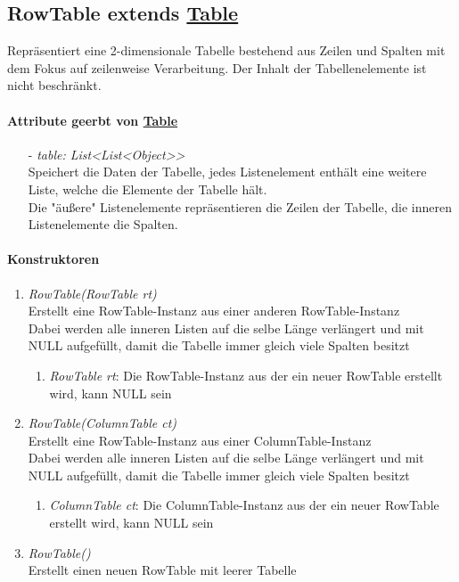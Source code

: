 \subsection{RowTable extends \hyperref[Table]{Table}}	
Repräsentiert eine 2-dimensionale Tabelle bestehend aus Zeilen und Spalten mit dem Fokus auf zeilenweise Verarbeitung. Der Inhalt der Tabellenelemente ist nicht beschränkt.
	
	
\paragraph{Attribute geerbt von \hyperref[Table]{Table}}

\begin{itemize}
	\item[-] \textit{table: List{<List<Object>}>} \\
	Speichert die Daten der Tabelle, jedes Listenelement enthält eine weitere Liste, welche die Elemente der Tabelle hält. \\
	Die "äußere" Listenelemente repräsentieren die Zeilen der Tabelle, die inneren Listenelemente die Spalten.
\end{itemize}


\paragraph{Konstruktoren}

\begin{enumerate}[+]
	\item \textit{RowTable(RowTable rt)} \\
	Erstellt eine RowTable-Instanz aus einer anderen RowTable-Instanz \\
	Dabei werden alle inneren Listen auf die selbe Länge verlängert und mit NULL aufgefüllt, damit die Tabelle immer gleich viele Spalten besitzt	
	\begin{enumerate}[$\bullet$]
		\item \textit{RowTable rt}: Die RowTable-Instanz aus der ein neuer RowTable erstellt wird, kann NULL sein
	\end{enumerate}
	\vspace{-0.2cm}
	
	
	\item \textit{RowTable(ColumnTable ct)} \\
	Erstellt eine RowTable-Instanz aus einer ColumnTable-Instanz \\
	Dabei werden alle inneren Listen auf die selbe Länge verlängert und mit NULL aufgefüllt, damit die Tabelle immer gleich viele Spalten besitzt	
	\begin{enumerate}[$\bullet$]
		\item \textit{ColumnTable ct}: Die ColumnTable-Instanz aus der ein neuer RowTable erstellt wird, kann NULL sein
	\end{enumerate}
	\vspace{-0.2cm}
	
	\item \textit{RowTable()} \\
	Erstellt einen neuen RowTable mit leerer Tabelle
\end{enumerate}


